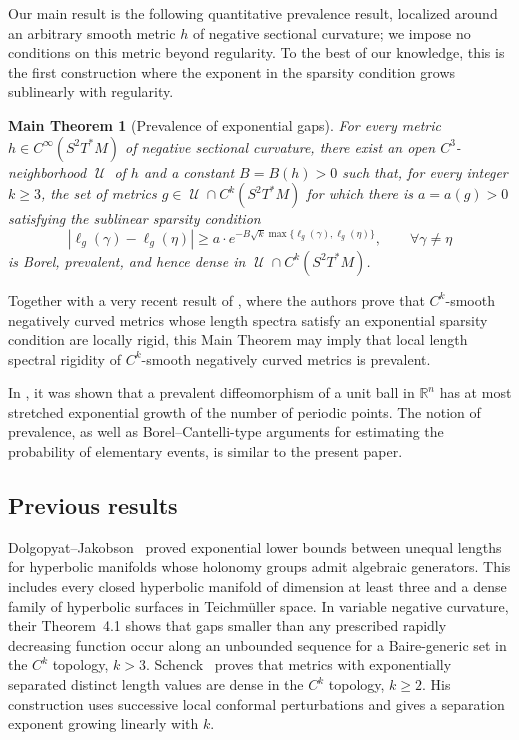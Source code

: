 \documentclass[10pt,oneside,reqno]{amsproc}
\numberwithin{equation}{section}
\newtheorem*{maintheorem}{Main Theorem}
\theoremstyle{definition}
\theoremstyle{remark}
\DeclareMathOperator{\cU}{{\mathscr U}}
\renewcommand{\ge}{\geqslant}
\begin{document}
Our main result is the following quantitative prevalence result, localized around an arbitrary smooth metric $h$ of negative sectional curvature; we impose no conditions on this metric beyond regularity. To the best of our knowledge, this is the first construction where the exponent in the sparsity condition grows sublinearly with regularity. 

\bigskip
\bigskip


\begin{maintheorem}[Prevalence of exponential gaps]
\label{thm:prevalence}
For every metric $h \in C^\infty(S^2T^*M)$ of negative sectional curvature, there exist an open $C^3$-neighborhood $\cU$ of $h$ and a constant $B=B(h)>0$ such that, for every integer $k\ge3$, the set of metrics $g\in\cU\cap C^k(S^2T^*M)$ for which there is $a = a(g)>0$ satisfying the \emph{sublinear sparsity condition}
\[
 |\ell_g(\gamma)-\ell_g(\eta)|
 \ge a \cdot e^{-B\sqrt{k}\max\{\ell_g(\gamma),\ell_g(\eta)\}},
 \qquad \forall \gamma\ne\eta
\]
is Borel, prevalent, and hence dense in $\cU\cap C^k(S^2T^*M)$. 
\end{maintheorem}

Together with a very recent result of \cite{DDRO}, where the authors prove that $C^k$-smooth negatively curved metrics whose length spectra satisfy an exponential sparsity condition are locally rigid, this Main Theorem may imply that local length spectral rigidity of $C^k$-smooth negatively curved metrics is prevalent.

In \cite{KH}, it was shown that a prevalent diffeomorphism of a unit ball in $\mathbb R^n$ has at most stretched exponential growth of the number of periodic points. The notion of prevalence, as well as Borel--Cantelli-type arguments for estimating the probability of elementary events, is similar to the present paper.

\subsection*{Previous results}

Dolgopyat--Jakobson~\cite{DJ} proved exponential lower bounds between unequal lengths for hyperbolic manifolds whose holonomy groups admit algebraic generators. This includes every closed hyperbolic manifold of dimension at least three and a dense family of hyperbolic surfaces in Teichm\"uller space. In variable negative curvature, their Theorem~4.1 shows that gaps smaller than any prescribed rapidly
decreasing function occur along an unbounded sequence for a Baire-generic
set in the $C^k$ topology, $k>3$. Schenck~\cite[Theorem~1]{Schenck} proves that metrics with exponentially separated distinct length values are dense in the $C^k$ topology, $k\ge2$. His construction uses successive local conformal perturbations and gives a separation exponent growing linearly with $k$. 
\end{document}
